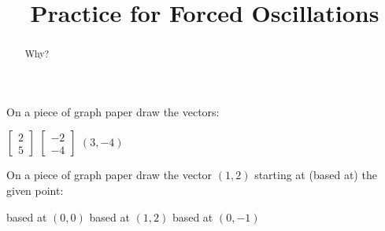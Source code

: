 \documentclass{ximera}
\title{Practice for Forced Oscillations}
\begin{document}
\begin{abstract}
Why?
\end{abstract}
\maketitle


\begin{exercise}
    On a piece of graph paper draw the vectors:
    \begin{tasks}
        \task
        $\begin{bmatrix}
            2 \\
            5 
        \end{bmatrix}$
        \task
        $\begin{bmatrix}
            -2 \\
            -4
        \end{bmatrix}$
        \task $(3,-4)$
    \end{tasks}
\end{exercise}

\begin{exercise}
    On a piece of graph paper draw the vector $(1,2)$ starting at (based at) the given point:
    \begin{tasks}
        \task based at $(0,0)$
        \task based at $(1,2)$
        \task based at $(0,-1)$
    \end{tasks}
\end{exercise}
\end{document}

